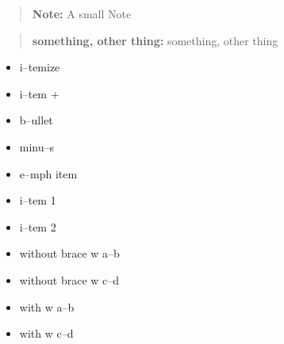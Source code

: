 \documentclass{book}
\begin{document}
\begin{quote}
\begin{footnotesize}
\textbf{Note:} A small Note
\end{footnotesize}
\end{quote}

\begin{quote}
\begin{footnotesize}
\textbf{something, other thing:} something, other thing
\end{footnotesize}
\end{quote}

\begin{itemize}
\item i--temize
\end{itemize}

\begin{itemize}[label=+]
\item i--tem +
\end{itemize}

\begin{itemize}[label=\textbullet{}]
\item b--ullet
\end{itemize}

\begin{itemize}[label=-]
\item minu--s
\end{itemize}

\begin{itemize}[label=\emph{after emph}]
\item e--mph item
\end{itemize}

\begin{itemize}[label=\textbullet{} a--n itemize line]
\item {}%
i--tem 1
\item i--tem 2
\end{itemize}

\begin{itemize}[label={}]
\item without brace w a--b
\item without brace w c--d
\end{itemize}

\begin{itemize}[label={}]
\item with w a--b
\item with w c--d
\end{itemize}
\end{document}
